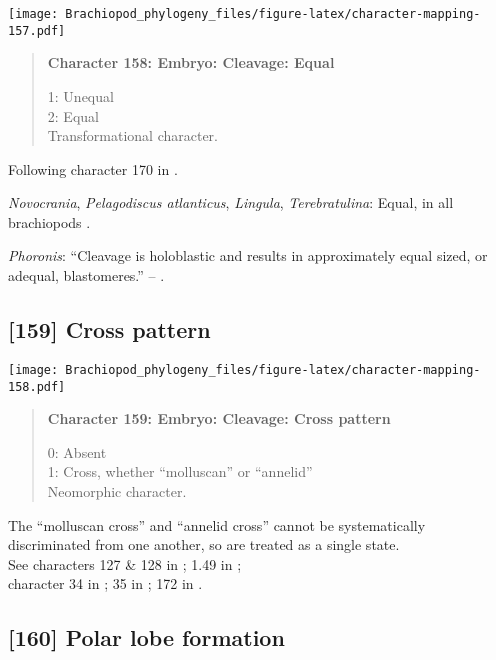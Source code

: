 \documentclass[openany]{book}
\theoremstyle{definition}
\theoremstyle{definition}
\theoremstyle{definition}
\theoremstyle{remark}
\begin{document}
\texttt{[image: Brachiopod\_phylogeny\_files/figure-latex/character-mapping-157.pdf]}

\begin{quote}
\textbf{Character 158: Embryo: Cleavage: Equal}

1: Unequal\\
2: Equal\\
Transformational character.
\end{quote}

Following character 170 in \citet{Giribet2002}.

\hypertarget{Lingula-coding-158}{}
\emph{Novocrania}, \emph{Pelagodiscus atlanticus}, \emph{Lingula},
\emph{Terebratulina}: Equal, in all brachiopods
\citep{Williams1997Introduction}.

\hypertarget{Phoronis-coding-158}{}
\emph{Phoronis}: ``Cleavage is holoblastic and results in approximately
equal sized, or adequal, blastomeres.'' -- \citet{Pennerstorfer2012}.

\subsection*{{[}159{]} Cross pattern}\label{cross-pattern}

\texttt{[image: Brachiopod\_phylogeny\_files/figure-latex/character-mapping-158.pdf]}

\begin{quote}
\textbf{Character 159: Embryo: Cleavage: Cross pattern}

0: Absent\\
1: Cross, whether ``molluscan'' or ``annelid''\\
Neomorphic character.
\end{quote}

The ``molluscan cross'' and ``annelid cross'' cannot be systematically
discriminated from one another, so are treated as a single state.\\
See characters 127 \& 128 in \citet{Rouse1999}; 1.49 in
\citet{SPS1996};\\
character 34 in \citet{Haszprunar1996}; 35 in \citet{Haszprunar2000};
172 in \citet{Giribet2002}.

\subsection*{{[}160{]} Polar lobe formation}\label{polar-lobe-formation}
\end{document}
